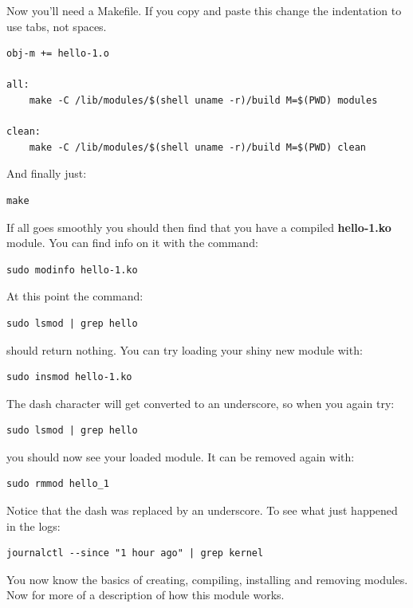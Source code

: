 \documentclass[11pt]{article}
\begin{document}
Now you'll need a Makefile. If you copy and paste this change the indentation to use tabs, not spaces.

\begin{verbatim}
obj-m += hello-1.o

all:
	make -C /lib/modules/$(shell uname -r)/build M=$(PWD) modules

clean:
	make -C /lib/modules/$(shell uname -r)/build M=$(PWD) clean
\end{verbatim}

And finally just:

\begin{verbatim}
make
\end{verbatim}

If all goes smoothly you should then find that you have a compiled \textbf{hello-1.ko} module. You can find info on it with the command:

\begin{verbatim}
sudo modinfo hello-1.ko
\end{verbatim}

At this point the command:

\begin{verbatim}
sudo lsmod | grep hello
\end{verbatim}

should return nothing. You can try loading your shiny new module with:

\begin{verbatim}
sudo insmod hello-1.ko
\end{verbatim}

The dash character will get converted to an underscore, so when you again try:

\begin{verbatim}
sudo lsmod | grep hello
\end{verbatim}

you should now see your loaded module. It can be removed again with:

\begin{verbatim}
sudo rmmod hello_1
\end{verbatim}

Notice that the dash was replaced by an underscore. To see what just happened in the logs:

\begin{verbatim}
journalctl --since "1 hour ago" | grep kernel
\end{verbatim}

You now know the basics of creating, compiling, installing and removing modules. Now for more of a description of how this module works.
\end{document}
